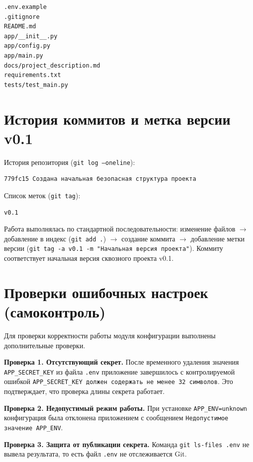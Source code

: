 \documentclass[12pt,a4paper]{article}
\begin{document}
\begin{lstlisting}
.env.example
.gitignore
README.md
app/__init__.py
app/config.py
app/main.py
docs/project_description.md
requirements.txt
tests/test_main.py
\end{lstlisting}

\section{История коммитов и метка версии v0.1}

История репозитория (\texttt{git log --oneline}):

\begin{lstlisting}
779fc15 Создана начальная безопасная структура проекта
\end{lstlisting}

Список меток (\texttt{git tag}):

\begin{lstlisting}
v0.1
\end{lstlisting}

Работа выполнялась по стандартной последовательности: изменение файлов $\rightarrow$ добавление в индекс (\texttt{git add .\allowbreak{}}) $\rightarrow$ создание коммита $\rightarrow$ добавление метки версии (\texttt{git tag -a v0.\allowbreak{}1 -m "Начальная версия проекта"}). Коммиту соответствует начальная версия сквозного проекта v0.1.

\section{Проверки ошибочных настроек (самоконтроль)}

Для проверки корректности работы модуля конфигурации выполнены дополнительные проверки.

\textbf{Проверка 1. Отсутствующий секрет.} После временного удаления значения \texttt{APP\_SECRET\_KEY} из файла \texttt{.\allowbreak{}env} приложение завершилось с контролируемой ошибкой \texttt{APP\_SECRET\_KEY должен содержать не менее 32 символов}. Это подтверждает, что проверка длины секрета работает.

\textbf{Проверка 2. Недопустимый режим работы.} При установке \texttt{APP\_ENV=unknown} конфигурация была отклонена приложением с сообщением \texttt{Недопустимое значение APP\_ENV}.

\textbf{Проверка 3. Защита от публикации секрета.} Команда \texttt{git ls-files .\allowbreak{}env} не вывела результата, то есть файл \texttt{.\allowbreak{}env} не отслеживается Git.
\end{document}
